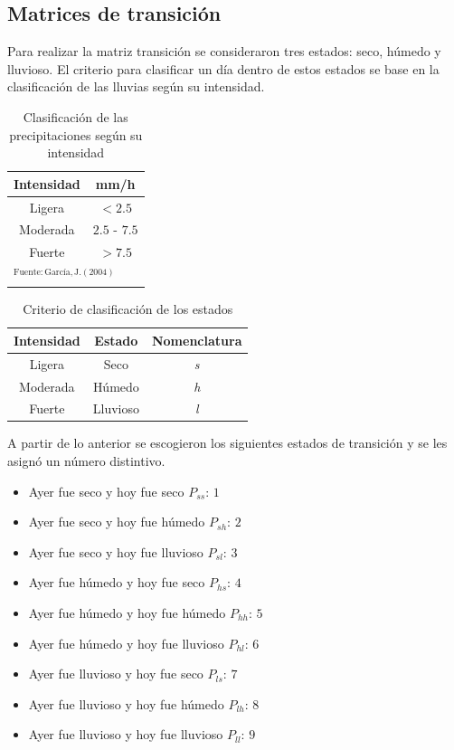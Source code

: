 \documentclass{article}
\begin{document}
\hypertarget{matrices-de-transicion}{%
\subsection{Matrices de transición}\label{matrices-de-transicion}}
Para realizar la matriz transición se consideraron tres estados: seco, húmedo y
lluvioso. El criterio para clasificar un día dentro de estos estados se base en la clasificación de las lluvias según su intensidad.

\begin{table}[H]
\caption{Clasificación de las precipitaciones según su intensidad}
\begin{center}
\begin{tabular}{|c|c|}
\hline
\textbf{Intensidad} & \textbf{mm/h} \\ \hline
Ligera & $<2.5$  \\ \hline
Moderada & $2.5$ - $7.5$  \\ \hline
Fuerte & $>7.5$ \\ \hline
\multicolumn{2}{l}{$^{\mathrm{Fuente:García, J. (2004)}}$}
\end{tabular}
\label{tab1}
\end{center}
\end{table}



\begin{table}[H]
\caption{Criterio de clasificación de los estados}
\begin{center}
\begin{tabular}{|c|c|c|}
\hline
\textbf{Intensidad} & \textbf{Estado} & \textbf{Nomenclatura} \\ \hline
Ligera & Seco & \textit{s} \\ \hline
Moderada & Húmedo & \textit{h} \\ \hline
Fuerte & Lluvioso & \textit{l} \\ \hline
\end{tabular}
\label{tab1}
\end{center}
\end{table}

A partir de lo anterior se escogieron los siguientes estados de transición y se les asignó un número distintivo. 

\begin{itemize}
\tightlist
\item
  Ayer fue seco y hoy fue seco \(P_{ss}\): \(1\)
\item
  Ayer fue seco y hoy fue húmedo \(P_{sh}\): \(2\)
\item
  Ayer fue seco y hoy fue lluvioso \(P_{sl}\): \(3\)
\item
  Ayer fue húmedo y hoy fue seco \(P_{hs}\): \(4\)
\item
  Ayer fue húmedo y hoy fue húmedo \(P_{hh}\): \(5\)
\item
  Ayer fue húmedo y hoy fue lluvioso \(P_{hl}\): \(6\)
\item
  Ayer fue lluvioso y hoy fue seco \(P_{ls}\): \(7\)
\item
  Ayer fue lluvioso y hoy fue húmedo \(P_{lh}\): \(8\)
\item
  Ayer fue lluvioso y hoy fue lluvioso \(P_{ll}\): \(9\)
\end{itemize}
\end{document}
